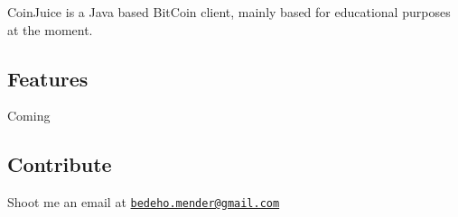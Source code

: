Coin\-Juice is a Java based Bit\-Coin client, mainly based for educational purposes at the moment.

\subsection*{Features }


\begin{DoxyItemize}
\item Coming
\end{DoxyItemize}

\subsection*{Contribute }

Shoot me an email at \href{mailto:bedeho.mender@gmail.com}{\tt bedeho.\-mender@gmail.\-com} 